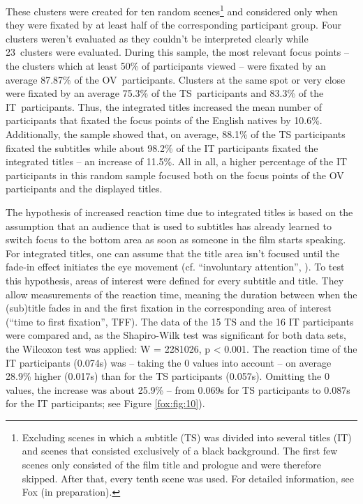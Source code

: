 \documentclass[output=paper]{langsci/langscibook}
\begin{document}
These clusters were created for ten random scenes\footnote{Excluding scenes in which a subtitle (TS) was divided into several titles (IT) and scenes that consisted exclusively of a black background. The first few scenes only consisted of the film title and prologue and were therefore skipped. After that, every tenth scene was used. For detailed information, see Fox (in preparation).} and considered only when they were fixated by at least half of the corresponding participant group. Four clusters weren’t evaluated as they couldn’t be interpreted clearly while 23~clusters were evaluated. During this sample, the most relevant focus points – the clusters which at least 50\% of participants viewed – were fixated by an average 87.87\% of the OV~participants. Clusters at the same spot or very close were fixated by an average 75.3\% of the TS~participants and 83.3\% of the IT~participants. Thus, the integrated titles increased the mean number of participants that fixated the focus points of the English natives by 10.6\%. Additionally, the sample showed that, on average, 88.1\% of the TS participants fixated the subtitles while about 98.2\% of the IT participants fixated the integrated titles – an increase of 11.5\%. All in all, a higher percentage of the IT participants in this random sample focused both on the focus points of the OV participants and the displayed titles.



The hypothesis of increased reaction time due to integrated titles is based on the assumption that an audience that is used to subtitles has already learned to switch focus to the bottom area as soon as someone in the film starts speaking. For integrated titles, one can assume that the title area isn’t focused until the fade-in effect initiates the eye movement (cf. “involuntary attention”, \citet[p. 74]{prinzmetal2005}). To test this hypothesis, areas of interest were defined for every subtitle and title. They allow measurements of the reaction time, meaning the duration between when the (sub)title fades in and the first fixation in the corresponding area of interest (“time to first fixation”, TFF). The data of the 15 TS and the 16 IT participants were compared and, as the Shapiro-Wilk test was significant for both data sets, the Wilcoxon test was applied: W = 2281026, p {\textless} 0.001. The reaction time of the IT participants (0.074s) was – taking the 0 values into account – on average 28.9\% higher (0.017s) than for the TS participants (0.057s). Omitting the 0 values, the increase was about 25.9\% – from 0.069s for TS participants to 0.087s for the IT participants; see Figure \ref{fox:fig:10}).
\end{document}
